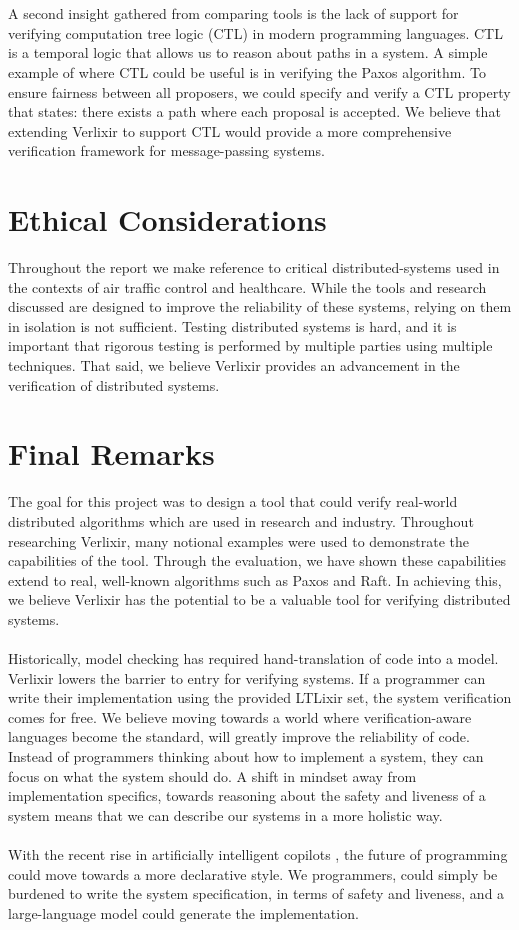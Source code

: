 \\ \\
A second insight gathered from comparing tools is the lack of support for verifying computation tree logic (CTL) in modern programming languages. CTL is a temporal logic that allows us to reason about paths in a system. A simple example of where CTL could be useful is in verifying the Paxos algorithm. To ensure fairness between all proposers, we could specify and verify a CTL property that states: there exists a path where each proposal is accepted. We believe that extending Verlixir to support CTL would provide a more comprehensive verification framework for message-passing systems.
\section{Ethical Considerations}
Throughout the report we make reference to critical distributed-systems used in the contexts of air traffic control and healthcare. While the tools and research discussed are designed to improve the reliability of these systems, relying on them in isolation is not sufficient. Testing distributed systems is hard, and it is important that rigorous testing is performed by multiple parties using multiple techniques. That said, we believe Verlixir provides an advancement in the verification of distributed systems.
\section{Final Remarks}
The goal for this project was to design a tool that could verify real-world distributed algorithms which are used in research and industry. Throughout researching Verlixir, many notional examples were used to demonstrate the capabilities of the tool. Through the evaluation, we have shown these capabilities extend to real, well-known algorithms such as Paxos and Raft. In achieving this, we believe Verlixir has the potential to be a valuable tool for verifying distributed systems.
\\ \\
Historically, model checking has required hand-translation of code into a model. Verlixir lowers the barrier to entry for verifying systems. If a programmer can write their implementation using the provided LTLixir set, the system verification comes for free. We believe moving towards a world where verification-aware languages become the standard, will greatly improve the reliability of code. Instead of programmers thinking about how to implement a system, they can focus on what the system should do. A shift in mindset away from implementation specifics, towards reasoning about the safety and liveness of a system means that we can describe our systems in a more holistic way.
\\ \\
With the recent rise in artificially intelligent copilots \cite{attention_is, copilot_asset,safety_ai}, the future of programming could move towards a more declarative style. We programmers, could simply be burdened to write the system specification, in terms of safety and liveness, and a large-language model could generate the implementation.